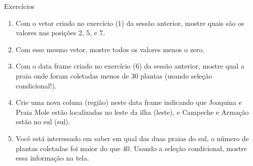 \documentclass[10pt,handout]{beamer}\usepackage[]{graphicx}\usepackage[]{color}
\makeatletter
\newcommand{\hlnum}[1]{\textcolor[rgb]{0.686,0.059,0.569}{#1}}%
\newcommand{\hlstr}[1]{\textcolor[rgb]{0.282,0.239,0.545}{#1}}%
\newcommand{\hlopt}[1]{\textcolor[rgb]{0,0,0}{#1}}%
\newcommand{\hlstd}[1]{\textcolor[rgb]{0.345,0.345,0.345}{#1}}%
\newcommand{\hlkwd}[1]{\textcolor[rgb]{0.282,0.239,0.545}{\textbf{#1}}}%
\newenvironment{kframe}{%
 \def\at@end@of@kframe{}%
 \ifinner\ifhmode%
  \def\at@end@of@kframe{\end{minipage}}%
  \begin{minipage}{\columnwidth}%
 \fi\fi%
 \def\FrameCommand##1{\hskip\@totalleftmargin \hskip-\fboxsep
 \colorbox{shadecolor}{##1}\hskip-\fboxsep
     \hskip-\linewidth \hskip-\@totalleftmargin \hskip\columnwidth}%
 \MakeFramed {\advance\hsize-\width
   \@totalleftmargin\z@ \linewidth\hsize
   \@setminipage}}%
 {\par\unskip\endMakeFramed%
 \at@end@of@kframe}
\newenvironment{knitrout}{}{} %
\makeatother
\begin{document}

\begin{frame}[fragile]{Exercícios}
  \begin{enumerate}
  \item Com o vetor criado no exercício (1) da sessão anterior, mostre
    quais são os valores nas posições 2, 5, e 7.
  \item Com esse mesmo vetor, mostre todos os valores menos o zero.
  \item Com o data frame criado no exercício (6) da sessão anterior,
    mostre qual a praia onde foram coletadas menos de 30 plantas (usando
    seleção condicional!).
  \item Crie uma nova coluna (região) neste data frame indicando que
    Joaquina e Praia Mole estão localizadas no leste da ilha (leste), e
    Campeche e Armação estão no sul (sul).
  \item Você está interessado em saber em qual das duas praias do sul, o
    número de plantas coletadas foi maior do que 40. Usando a seleção
    condicional, mostre essa informação na tela.
  \end{enumerate}
\end{frame}
\end{document}
